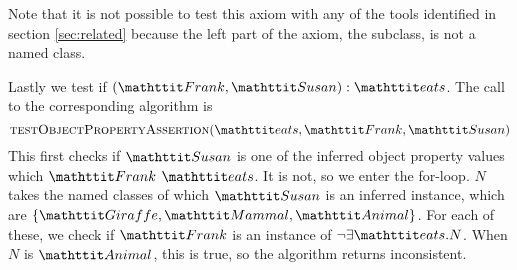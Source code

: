 \documentclass[paper.tex]{subfiles}
\begin{document}
Note that it is not possible to test this axiom with any of the tools identified in section \ref{sec:related} because the left part of the axiom, the subclass, is not a named class.

Lastly we test if $(\oent{Frank}, \oent{Susan}) : \oent{eats}$.
The call to the corresponding algorithm is
\[ \Call{testObjectPropertyAssertion}{\oent{eats}, \oent{Frank}, \oent{Susan}} \]
This first checks if $\oent{Susan}$ is one of the inferred object property values which $\oent{Frank}$ $\oent{eats}$.
It is not, so we enter the for-loop.
$N$ takes the named classes of which $\oent{Susan}$ is an inferred instance, which are $\{\oent{Giraffe}, \oent{Mammal}, \oent{Animal}\}$.
For each of these, we check if $\oent{Frank}$ is an instance of $\neg \exists \oent{eats} . N$.
When $N$ is $\oent{Animal}$, this is true, so the algorithm returns inconsistent.

\end{document}
